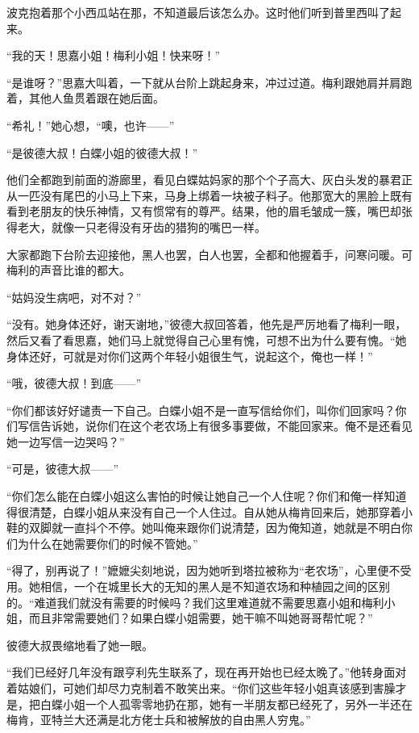 \par 波克抱着那个小西瓜站在那，不知道最后该怎么办。这时他们听到普里西叫了起来。
\par “我的天！思嘉小姐！梅利小姐！快来呀！”
\par “是谁呀？”思嘉大叫着，一下就从台阶上跳起身来，冲过过道。梅利跟她肩并肩跑着，其他人鱼贯着跟在她后面。
\par “希礼！”她心想，“噢，也许——”
\par “是彼德大叔！白蝶小姐的彼德大叔！”
\par 他们全都跑到前面的游廊里，看见白蝶姑妈家的那个个子高大、灰白头发的暴君正从一匹没有尾巴的小马上下来，马身上绑着一块被子料子。他那宽大的黑脸上既有看到老朋友的快乐神情，又有惯常有的尊严。结果，他的眉毛皱成一簇，嘴巴却张得老大，就像一只老得没有牙齿的猎狗的嘴巴一样。
\par 大家都跑下台阶去迎接他，黑人也罢，白人也罢，全都和他握着手，问寒问暖。可梅利的声音比谁的都大。
\par “姑妈没生病吧，对不对？”
\par “没有。她身体还好，谢天谢地，”彼德大叔回答着，他先是严厉地看了梅利一眼，然后又看了看思嘉，她们马上就觉得自己心里有愧，可想不出为什么要有愧。“她身体还好，可就是对你们这两个年轻小姐很生气，说起这个，俺也一样！”
\par “哦，彼德大叔！到底——”
\par “你们都该好好谴责一下自己。白蝶小姐不是一直写信给你们，叫你们回家吗？你们写信告诉她，说你们在这个老农场上有很多事要做，不能回家来。俺不是还看见她一边写信一边哭吗？”
\par “可是，彼德大叔——”
\par “你们怎么能在白蝶小姐这么害怕的时候让她自己一个人住呢？你们和俺一样知道得很清楚，白蝶小姐从来没有自己一个人住过。自从她从梅肯回来后，她那穿着小鞋的双脚就一直抖个不停。她叫俺来跟你们说清楚，因为俺知道，她就是不明白你们为什么在她需要你们的时候不管她。”
\par “得了，别再说了！”嬷嬷尖刻地说，因为她听到塔拉被称为“老农场”，心里便不受用。她相信，一个在城里长大的无知的黑人是不知道农场和种植园之间的区别的。“难道我们就没有需要的时候吗？我们这里难道就不需要思嘉小姐和梅利小姐，而且非常需要她们？如果白蝶小姐需要，她干嘛不叫她哥哥帮忙呢？”
\par 彼德大叔畏缩地看了她一眼。
\par “我们已经好几年没有跟亨利先生联系了，现在再开始也已经太晚了。”他转身面对着姑娘们，可她们却尽力克制着不敢笑出来。“你们这些年轻小姐真该感到害臊才是，把白蝶小姐一个人孤零零地扔在那，她有一半朋友都已经死了，另外一半还在梅肯，亚特兰大还满是北方佬士兵和被解放的自由黑人穷鬼。”

